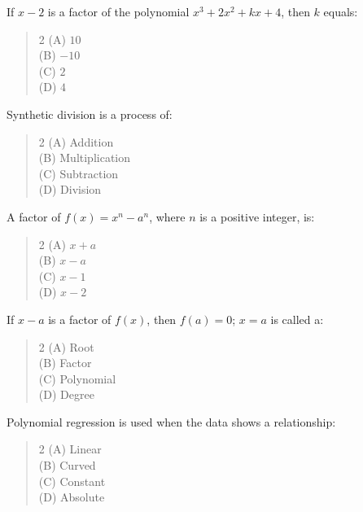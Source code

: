 \documentclass[11pt,a4paper]{article}
\begin{document}
\begin{mcqlist}
\item If $x-2$ is a factor of the polynomial $x^3+2x^2+kx+4$, then $k$ equals:
\begin{quote}\begin{multicols}{2}
\noindent (A) $10$ \\
(B) $-10$ \\
(C) $2$ \\
(D) $4$
\end{multicols}\end{quote}

\item Synthetic division is a process of:
\begin{quote}\begin{multicols}{2}
\noindent (A) Addition \\
(B) Multiplication \\
(C) Subtraction \\
(D) Division
\end{multicols}\end{quote}

\item A factor of $f(x)=x^n-a^n$, where $n$ is a positive integer, is:
\begin{quote}\begin{multicols}{2}
\noindent (A) $x+a$ \\
(B) $x-a$ \\
(C) $x-1$ \\
(D) $x-2$
\end{multicols}\end{quote}

\item If $x-a$ is a factor of $f(x)$, then $f(a)=0$; $x=a$ is called a:
\begin{quote}\begin{multicols}{2}
\noindent (A) Root \\
(B) Factor \\
(C) Polynomial \\
(D) Degree
\end{multicols}\end{quote}

\item Polynomial regression is used when the data shows a \underline{\hspace{1.5cm}} relationship:
\begin{quote}\begin{multicols}{2}
\noindent (A) Linear \\
(B) Curved \\
(C) Constant \\
(D) Absolute
\end{multicols}\end{quote}


\end{mcqlist}
\end{document}
